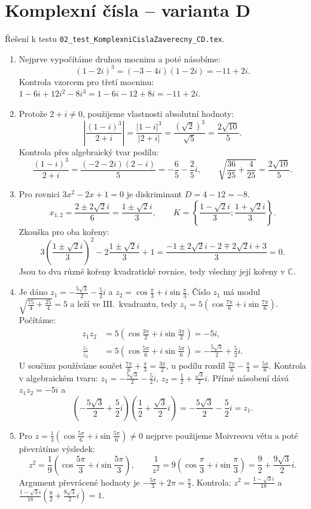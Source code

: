 \documentclass[a4paper,10pt]{article}
\begin{document}
\newpage
\section*{Komplexní čísla -- varianta D}
Řešení k testu \texttt{02\_test\_KomplexniCislaZaverecny\_CD.tex}.
\begin{enumerate}
\item Nejprve vypočítáme druhou mocninu a poté násobíme:
\[
(1-2i)^3=(-3-4i)(1-2i)=-11+2i.
\]
Kontrola vzorcem pro třetí mocninu:
$1-6i+12i^2-8i^3=1-6i-12+8i=-11+2i$.

\item Protože $2+i\neq0$, použijeme vlastnosti absolutní hodnoty:
\[
\left|\frac{(1-i)^3}{2+i}\right|
=\frac{|1-i|^3}{|2+i|}
=\frac{(\sqrt2)^3}{\sqrt5}=\frac{2\sqrt{10}}5.
\]
Kontrola přes algebraický tvar podílu:
\[
\frac{(1-i)^3}{2+i}=\frac{(-2-2i)(2-i)}5=-\frac65-\frac25i,
\qquad
\sqrt{\frac{36}{25}+\frac4{25}}=\frac{2\sqrt{10}}5.
\]

\item Pro rovnici $3x^2-2x+1=0$ je diskriminant $D=4-12=-8$.
\[
x_{1,2}=\frac{2\pm2\sqrt2i}{6}=\frac{1\pm\sqrt2i}{3},
\qquad K=\left\{\frac{1-\sqrt2i}{3};\frac{1+\sqrt2i}{3}\right\}.
\]
Zkouška pro oba kořeny:
\[
3\left(\frac{1\pm\sqrt2i}{3}\right)^2
-2\frac{1\pm\sqrt2i}{3}+1
=\frac{-1\pm2\sqrt2i-2\mp2\sqrt2i+3}{3}=0.
\]
Jsou to dva různé kořeny kvadratické rovnice, tedy všechny její kořeny v $\mathbb C$.

\item Je dáno $z_1=-\frac{5\sqrt3}{2}-\frac52i$ a
$z_2=\cos\frac\pi3+i\sin\frac\pi3$.
Číslo $z_1$ má modul $\sqrt{\frac{75}{4}+\frac{25}{4}}=5$ a leží ve III.~kvadrantu,
tedy $z_1=5(\cos\frac{7\pi}{6}+i\sin\frac{7\pi}{6})$. Počítáme:
\begin{align*}
z_1z_2
&=5\left(\cos\frac{3\pi}{2}+i\sin\frac{3\pi}{2}\right)=-5i,\\
\frac{z_1}{z_2}
&=5\left(\cos\frac{5\pi}{6}+i\sin\frac{5\pi}{6}\right)
=-\frac{5\sqrt3}{2}+\frac52i.
\end{align*}
U součinu používáme součet $\frac{7\pi}{6}+\frac\pi3=\frac{3\pi}{2}$,
u podílu rozdíl $\frac{7\pi}{6}-\frac\pi3=\frac{5\pi}{6}$.
Kontrola v algebraickém tvaru:
$z_1=-\frac{5\sqrt3}{2}-\frac52i$, $z_2=\frac12+\frac{\sqrt3}{2}i$.
Přímé násobení dává $z_1z_2=-5i$ a
\[
\left(-\frac{5\sqrt3}{2}+\frac52i\right)
\left(\frac12+\frac{\sqrt3}{2}i\right)
=-\frac{5\sqrt3}{2}-\frac52i=z_1.
\]

\item Pro $z=\frac13(\cos\frac{5\pi}{6}+i\sin\frac{5\pi}{6})\neq0$
nejprve použijeme Moivreovu větu a poté převrátíme výsledek:
\[
z^2=\frac19\left(\cos\frac{5\pi}{3}+i\sin\frac{5\pi}{3}\right),
\qquad
\frac1{z^2}=9\left(\cos\frac\pi3+i\sin\frac\pi3\right)
=\frac92+\frac{9\sqrt3}{2}i.
\]
Argument převrácené hodnoty je
$-\frac{5\pi}{3}+2\pi=\frac\pi3$.
Kontrola: $z^2=\frac{1-\sqrt3i}{18}$ a
$\frac{1-\sqrt3i}{18}(\frac92+\frac{9\sqrt3}{2}i)=1$.
\end{enumerate}
\end{document}
